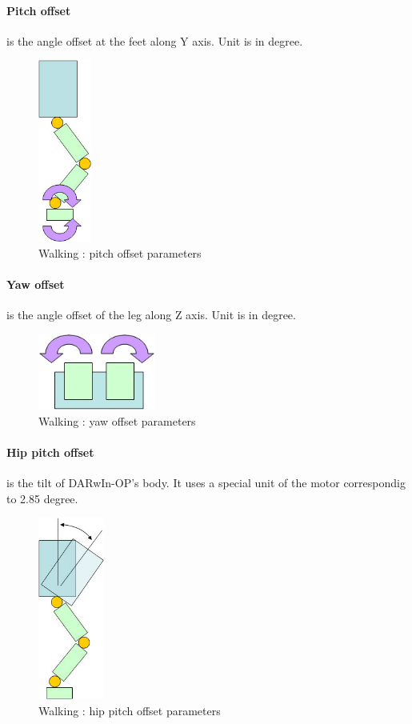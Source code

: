 \documentclass[a4paper, 12pt]{article}  		%
\begin{document}
\paragraph*{Pitch offset}
is the angle offset at the feet along Y axis. Unit is in degree.
\begin{figure}[H]
\begin{center}
\includegraphics[height=6cm]{pitch_offset.jpg}
\caption{Walking : pitch offset parameters}
\label{pitch_offset}
\end{center}
\end{figure}

\paragraph*{Yaw offset}
is the angle offset of the leg along Z axis. Unit is in degree.
\begin{figure}[H]
\begin{center}
\includegraphics[height=2.5cm]{yaw_offset.jpg}
\caption{Walking : yaw offset parameters}
\label{yaw_offset}
\end{center}
\end{figure}

\paragraph*{Hip pitch offset}
is the tilt of DARwIn-OP's body. It uses a special unit of the motor correspondig to 2.85 degree.
\begin{figure}[H]
\begin{center}
\includegraphics[height=6cm]{hip_pitch_offset.jpg}
\caption{Walking : hip pitch offset parameters}
\label{hip_pitch_offset}
\end{center}
\end{figure}
\end{document}
